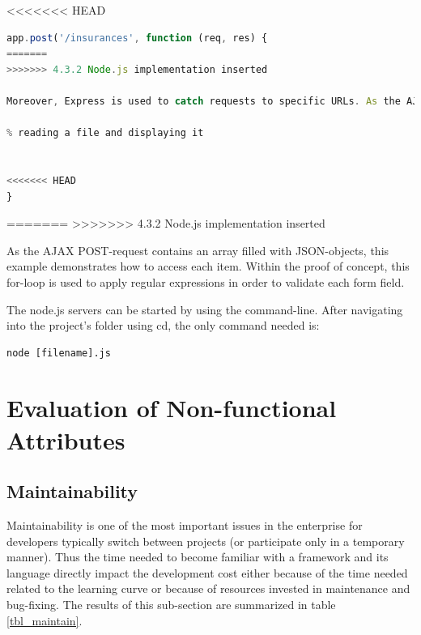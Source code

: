 <<<<<<< HEAD
\begin{lstlisting}[language=javascript,caption={Handling an HTTP POST request with Node.js}]
app.post('/insurances', function (req, res) {
=======
>>>>>>> 4.3.2 Node.js implementation inserted

Moreover, Express is used to catch requests to specific URLs. As the AJAX call coming from the user interface is set up as POST-request, the following code shows how to catch this (AJAX-driven) POST-request in node.js on http://localhost:8888/insurances:

% reading a file and displaying it


<<<<<<< HEAD
}
\end{lstlisting}
=======
>>>>>>> 4.3.2 Node.js implementation inserted

As the AJAX POST-request contains an array filled with JSON-objects, this example demonstrates how to access each item. Within the proof of concept, this for-loop is used to apply regular expressions in order to validate each form field.

The node.js servers can be started by using the command-line. After navigating into the project’s folder using cd, the only command needed is:
\begin{lstlisting}[caption={Executing Node.js code}]
node [filename].js
\end{lstlisting}


\newpage
\section{Evaluation of Non-functional Attributes}
\label{evaluation_nonfunctional}

\subsection{Maintainability}
\label{maintainability}
Maintainability is one of the most important issues in the enterprise for developers typically switch between projects (or participate only in a temporary manner). Thus the time needed to become familiar with a framework and its language directly impact the development cost either because of the time needed related to the learning curve or because of resources invested in maintenance and bug-fixing.
The results of this sub-section are summarized in table \ref{tbl_maintain}.\\

